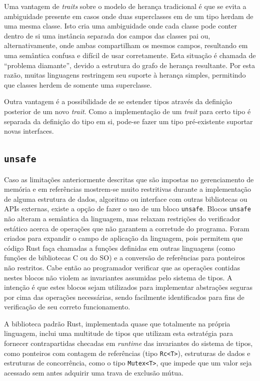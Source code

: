 \documentclass[tg]{mdtufsm}
\newcommand{\todo}[1]{}
\begin{document}
Uma vantagem de \emph{traits} sobre o modelo de herança tradicional é que se evita a ambiguidade presente em casos onde duas superclasses em de um tipo herdam de uma mesma classe. Isto cria uma ambiguidade onde cada classe pode conter dentro de si uma instância separada dos campos das classes pai ou, alternativamente, onde ambas compartilham os mesmos campos, resultando em uma semântica confusa e difícil de usar corretamente. Esta situação é chamada de ``problema diamante'', devido a estrutura do grafo de herança resultante. Por esta razão, muitas linguagens restringem seu suporte à herança simples, permitindo que classes herdem de somente uma superclasse. \citep{scharli2003}

Outra vantagem é a possibilidade de se estender tipos através da definição posterior de um novo \emph{trait}. Como a implementação de um \emph{trait} para certo tipo é separada da definição do tipo em si, pode-se fazer um tipo pré-existente suportar novas interfaces. \todo{exemplo junto com o 1o?}

\subsection{\texttt{unsafe}}

Caso as limitações anteriormente descritas que são impostas no gerenciamento de memória e em referências mostrem-se muito restritivas durante a implementação de alguma estrutura de dados, algoritmo ou interface com outras bibliotecas ou APIs externas, existe a opção de fazer o uso de um bloco \texttt{unsafe}. Blocos \texttt{unsafe} não alteram a semântica da linguagem, mas relaxam restrições do verificador estático acerca de operações que não garantem a corretude do programa. Foram criados para expandir o campo de aplicação da linguagem, pois permitem que código Rust faça chamadas a funções definidas em outras linguagens (como funções de bibliotecas C ou do SO) e a conversão de referências para ponteiros não restritos. Cabe então ao programador verificar que as operações contidas nestes blocos não violem as invariantes assumidas pelo sistema de tipos. A intenção é que estes blocos sejam utilizados para implementar abstrações seguras por cima das operações necessárias, sendo facilmente identificados para fins de verificação de seu correto funcionamento. \citep{rust-unsafe}

A biblioteca padrão Rust, implementada quase que totalmente na própria linguagem, inclui uma multitude de tipos que utilizam esta estratégia para fornecer contrapartidas checadas em \emph{runtime} das invariantes do sistema de tipos, como ponteiros com contagem de referências (tipo \texttt{Rc<T>}), estruturas de dados e estruturas de concorrência, como o tipo \texttt{Mutex<T>}, que impede que um valor seja acessado sem antes adquirir uma trava de exclusão mútua.
\end{document}
